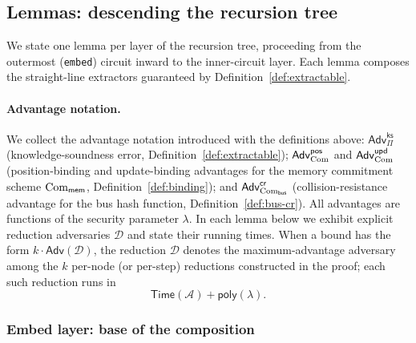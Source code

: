 \subsection{Lemmas: descending the recursion tree}\label{sec:security:lemmas}

We state one lemma per layer of the recursion tree, proceeding from the
outermost (\texttt{embed}) circuit inward to the inner-circuit layer.  Each
lemma composes the straight-line extractors guaranteed by
Definition~\ref{def:extractable}.

\paragraph{Advantage notation.}
We collect the advantage notation introduced with the definitions above:
$\mathsf{Adv}^{\mathsf{ks}}_{\Pi}$ (knowledge-soundness error,
Definition~\ref{def:extractable});
$\mathsf{Adv}^{\mathsf{pos}}_{\mathrm{Com}}$ and $\mathsf{Adv}^{\mathsf{upd}}_{\mathrm{Com}}$
(position-binding and update-binding advantages for the memory commitment
scheme $\mathrm{Com}_{\mathsf{mem}}$, Definition~\ref{def:binding}); and $
  \mathsf{Adv}^{\mathsf{cr}}_{\mathrm{Com}_{\mathsf{bus}}}$
(collision-resistance advantage
for the bus hash function, Definition~\ref{def:bus-cr}).
All advantages are functions of the security parameter $\lambda$.
In each lemma below we exhibit explicit reduction adversaries $\mathcal{D}$
and state their running times.
When a bound has the form $k\cdot\mathsf{Adv}(\mathcal{D})$, the reduction
$\mathcal{D}$ denotes the maximum-advantage adversary among the $k$ per-node
(or per-step) reductions constructed in the proof; each such reduction runs in
\[
  \mathsf{Time}(\mathcal{A})+\mathsf{poly}(\lambda).
\]


\subsubsection{Embed layer: base of the composition}\label{sec:lem:embed}

